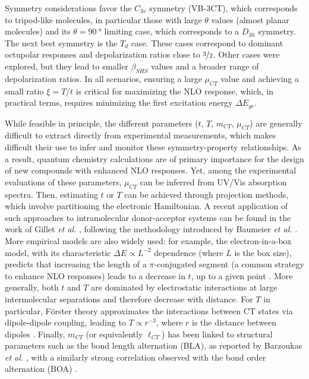 \documentclass[USenglish]{article}
\begin{document}
Symmetry considerations favor the $C_{3v}$ symmetry (VB-3CT), which corresponds to tripod-like molecules, in particular those with large $\theta$ values (almost planar molecules) and its $\theta = \SI{90}{\degree}$ limiting case, which corresponds to a $D_{3h}$ symmetry. The next best symmetry is the $T_d$ case. These cases correspond to dominant octupolar responses and depolarization ratios close to $\nicefrac{3}{2}$. Other cases were explored, but they lead to smaller $\beta_{SHS}$ values and a broader range of depolarization ratios. In all scenarios, ensuring a large $\mu_{CT}$ value and achieving a small ratio $\xi = T/t$ is critical for maximizing the NLO response, which, in practical terms, requires minimizing the first excitation energy $\Delta E_{ge}$.

While feasible in principle, the different parameters ($t$, $T$, $m_{CT}$, $\mu_{CT}$) are generally difficult to extract directly from experimental measurements, which makes difficult their use to infer and monitor these symmetry-property relationships.  As a result, quantum chemistry calculations are of primary importance for the design of new compounds with enhanced NLO responses. Yet, among the experimental evaluations of these parameters, $\mu_{CT}$ can be inferred from UV/Vis absorption spectra. Then, estimating $t$ or $T$ can be achieved through projection methods, which involve partitioning the electronic Hamiltonian. A recent application of such approaches to intramolecular donor-acceptor systems can be found in the work of Gillet \emph{et al.} \cite{gilletElectronicCouplingCalculations2016}, following the methodology introduced by Baumeier \emph{et al.} \cite{baumeierDensityfunctionalBasedDetermination2010}. More empirical models are also widely used: for example, the electron-in-a-box model, with its characteristic $\Delta E \propto L^{-2}$ dependence (where $L$ is the box size), predicts that increasing the length of a $\pi$-conjugated segment (a common strategy to enhance NLO responses) leads to a decrease in $t$, up to a given point \cite{luValenceBondChargeTransferModel1994}. More generally, both $t$ and $T$ are dominated by electrostatic interactions at large intermolecular separations and therefore decrease with distance. For $T$ in particular, Förster theory approximates the interactions between CT states via dipole-dipole coupling, leading to $T \propto r^{-3}$, where $r$ is the distance between dipoles \cite{sistoInitioNonadiabaticDynamics2014}.
Finally, $m_{CT}$ (or equivalently $\ell_{CT}$) has been linked to structural parameters such as the bond length alternation (BLA), as reported by Barzoukas \emph{et al.} \cite{barzoukasTWOFORMDESCRIPTIONPUSHPULL1996,barzoukasTwostateDescriptionHyper1996}, with a similarly strong correlation observed with the bond order alternation (BOA) \cite{dellaiDynamicEffectsNonlinear2024}.
\end{document}
